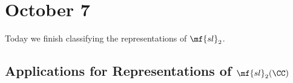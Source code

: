 \documentclass[../notes.tex]{subfiles}
\begin{document}
\section{October 7}
Today we finish classifying the representations of $\mf{sl}_2$.

\subsection{Applications for Representations of \texorpdfstring{$\mf{sl}_2(\CC)$}{sl2(C)}}

\end{document}

